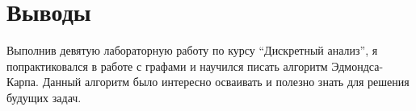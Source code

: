 \section{Выводы}
Выполнив девятую лабораторную работу по курсу \enquote{Дискретный анализ}, я попрактиковался в работе с графами и научился писать алгоритм Эдмондса-Карпа. Данный алгоритм было интересно осваивать и полезно знать для решения будущих задач.
\pagebreak
